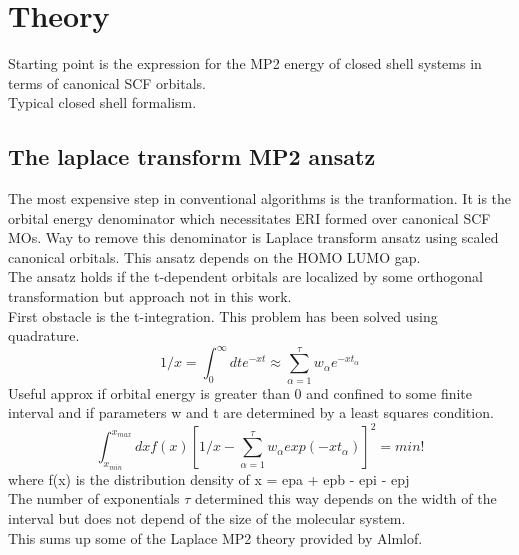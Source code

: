 \documentclass[10pt, draft]{article}
\begin{document}
\section{Theory}
Starting point is the expression for the MP2 energy of closed shell systems in terms of canonical SCF orbitals.\\
Typical closed shell formalism.

\subsection{The laplace transform MP2 ansatz}
The most expensive step in conventional algorithms is the tranformation.  It is the orbital energy denominator which necessitates ERI formed over canonical SCF MOs.  Way to remove this denominator is Laplace transform ansatz using scaled canonical orbitals.  This ansatz depends on the HOMO LUMO gap.\\
The ansatz holds if the t-dependent orbitals are localized by some orthogonal transformation but approach not in this work.\\
First obstacle is the t-integration. This problem has been solved using quadrature. 
\[1/x = \int_0^\infty dt e^{-xt} \approx \sum_{\alpha =1} ^\tau w_\alpha e^{-xt_\alpha}\]
Useful approx if orbital energy is greater than 0 and confined to some finite interval and if parameters w and t are determined by a least squares condition.
\[\int_{x_{min}}^{x_{max}} dx f(x) [ 1/x - \sum_{\alpha = 1} ^\tau w_\alpha exp(-xt_\alpha)]^2 = min!\]
where f(x) is the distribution density of x = epa + epb - epi - epj\\
The number of exponentials $\tau$ determined  this way depends on the width of the interval but does not depend of the size of the molecular system.\\
This sums up some of the Laplace MP2 theory provided by Almlof.
\end{document}
